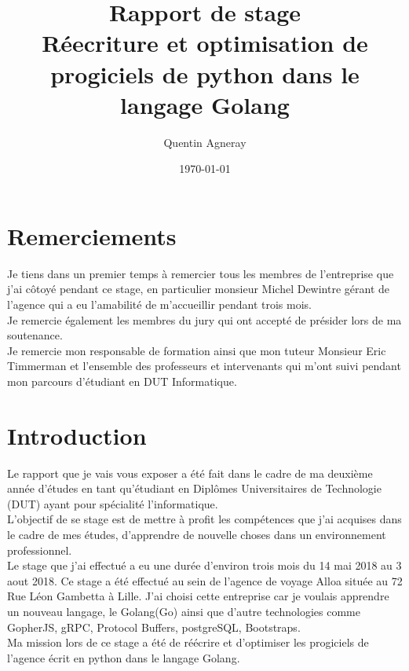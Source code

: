 \documentclass[12pt,a4paper]{report}
\title{Rapport de stage\\
\large Réecriture et optimisation de progiciels de python dans le langage Golang}
\author{Quentin Agneray}
\date{\today}
\newcommand\blankpage{%
    \null
    \thispagestyle{empty}%
    \addtocounter{page}{-1}%
    \newpage}
\begin{document}
\maketitle

\afterpage{\blankpage}

\tableofcontents
\listoffigures
\chapter[Remerciements]{Remerciements}
Je tiens dans un premier temps à remercier tous les membres de l'entreprise que j'ai côtoyé pendant ce stage, en particulier monsieur Michel Dewintre gérant de l'agence qui a eu l'amabilité de m'accueillir pendant trois mois.\\

Je remercie également les membres du jury qui ont accepté de présider lors de ma soutenance.\\

Je remercie mon responsable de formation ainsi que mon tuteur Monsieur Eric Timmerman et l'ensemble des professeurs et intervenants qui m'ont suivi pendant mon parcours d'étudiant en DUT Informatique.
\newpage
\chapter[Introduction]{Introduction}
Le rapport que je vais vous exposer a été fait dans le cadre de ma deuxième
année d'études en tant qu'étudiant en Diplômes Universitaires de Technologie
(DUT) ayant pour spécialité l'informatique.\\

L'objectif de se stage est de mettre à profit les compétences que j'ai acquises dans le cadre de mes études, d'apprendre de nouvelle choses dans un environnement professionnel.\\

 Le stage que j'ai effectué a eu une durée d'environ trois mois du 14 mai 2018 au 3 aout 2018. Ce stage a été effectué au sein de l'agence de voyage Alloa située au 72 Rue Léon Gambetta à Lille. J'ai choisi cette entreprise car je voulais apprendre un nouveau langage, le Golang(Go) ainsi que d'autre technologies comme GopherJS, gRPC, Protocol Buffers, postgreSQL, Bootstraps.\\
 
 Ma mission lors de ce stage a été de réécrire et d'optimiser les progiciels de l'agence écrit en python dans le langage Golang.\\
 
\end{document}
